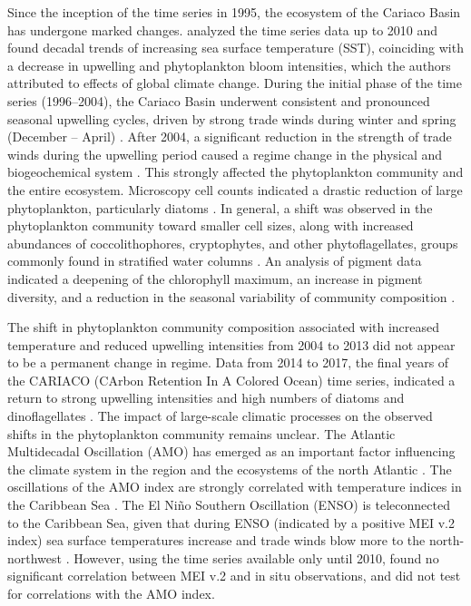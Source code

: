 \documentclass[draft]{agujournal2019}
\begin{document}
Since the inception of the time series in 1995, the ecosystem of the Cariaco Basin has undergone marked changes.  analyzed the time series data up to 2010 and found decadal trends of increasing sea surface temperature (SST), coinciding with a decrease in upwelling and phytoplankton bloom intensities, which the authors attributed to effects of global climate change. During the initial phase of the time series (1996–2004), the Cariaco Basin underwent consistent and pronounced seasonal upwelling cycles, driven by strong trade winds during winter and spring (December – April) \cite{mullerkarger_annual_2001, astor_seasonal_2003}. After 2004, a significant reduction in the strength of trade winds during the upwelling period caused a regime change in the physical and biogeochemical system \cite{taylor_ecosystem_2012}. This strongly affected the phytoplankton community and the entire ecosystem. Microscopy cell counts indicated a drastic reduction of large phytoplankton, particularly diatoms \cite{pinckney_phytoplankton_2015}. In general, a shift was observed in the phytoplankton community toward smaller cell sizes, along with increased abundances of coccolithophores, cryptophytes, and other phytoflagellates, groups commonly found in stratified water columns \cite{lorenzoni_characterization_2015}. An analysis of pigment data indicated a deepening of the chlorophyll maximum, an increase in pigment diversity, and a reduction in the seasonal variability of community composition \cite{pinckney_phytoplankton_2015}. 

The shift in phytoplankton community composition associated with increased temperature and reduced upwelling intensities from 2004 to 2013 did not appear to be a permanent change in regime. Data from 2014 to 2017, the final years of the CARIACO (CArbon Retention In A Colored Ocean) time series, indicated a return to strong upwelling intensities and high numbers of diatoms and dinoflagellates \cite{muller-karger_scientific_2019}. The impact of large-scale climatic processes on the observed shifts in the phytoplankton community remains unclear. The Atlantic Multidecadal Oscillation (AMO) has emerged as an important factor influencing the climate system in the region and the ecosystems of the north Atlantic \cite{nye_ecosystem_2014}. The oscillations of the AMO index are strongly correlated with temperature indices in the Caribbean Sea \cite{stephenson_changes_2014}. The El Niño Southern Oscillation (ENSO) is teleconnected to the Caribbean Sea, given that during ENSO (indicated by a positive MEI v.2 index) sea surface temperatures increase and trade winds blow more to the north-northwest \cite{enfield_tropical_1997}. However, using the time series available only until 2010,  found no significant correlation between MEI v.2 and in situ observations, and did not test for correlations with the AMO index.
\end{document}
